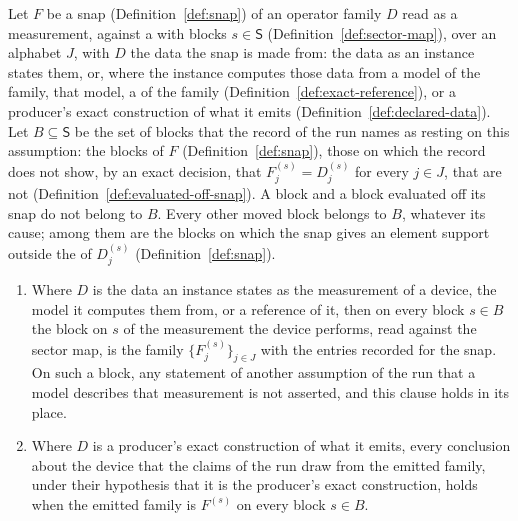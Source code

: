 \begin{assumption}\label{ass:snapped-measurement}
Let $F$ be a snap (Definition~\ref{def:snap}) of an operator family $D$ read
as a measurement, against a  with blocks $s\in\mathsf{S}$
(Definition~\ref{def:sector-map}), over an alphabet $J$, with $D$ the data the
snap is made from: the data as an instance states them, or, where the
instance computes those data from a model of the family, that model, a
 of the family (Definition~\ref{def:exact-reference}), or a
producer's exact construction of what it emits
(Definition~\ref{def:declared-data}). Let $B\subseteq\mathsf{S}$ be the set of
blocks that the record of the run names as resting on this assumption: the
 blocks of $F$ (Definition~\ref{def:snap}), those on which the
record does not show, by an exact decision, that $F^{(s)}_j=D^{(s)}_j$ for
every $j\in J$, that are not 
(Definition~\ref{def:evaluated-off-snap}). A  block and a block
evaluated off its snap do not belong to $B$. Every other moved block belongs
to $B$, whatever its cause; among them are the blocks on which the snap gives
an element support outside the  of $D^{(s)}_j$
(Definition~\ref{def:snap}).
\begin{enumerate}[label=(\roman*),leftmargin=2.4em]
\item Where $D$ is the data an instance states as the measurement of a
  device, the model it computes them from, or a reference of it, then on every block $s\in B$ the block on $s$
  of the measurement the device performs, read against the sector map, is
  the family $\{F^{(s)}_j\}_{j\in J}$ with the entries recorded for the snap.
  On such a block, any statement of another assumption of the run that a
  model describes that measurement is not asserted, and this clause holds in
  its place.
\item Where $D$ is a producer's exact construction of what it emits, every
  conclusion about the device that the claims of the run draw from the
  emitted family, under their hypothesis that it is the producer's exact
  construction, holds when the emitted family is $F^{(s)}$ on every block
  $s\in B$.
\end{enumerate}
\end{assumption}
